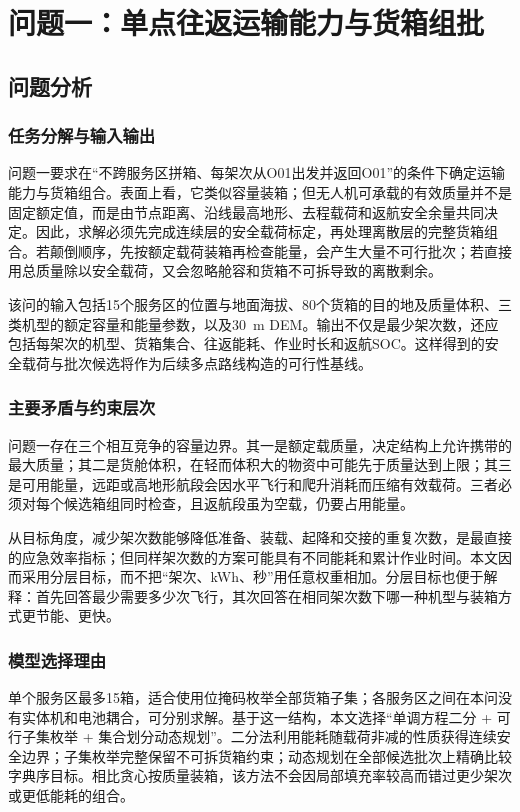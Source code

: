 \section{问题一：单点往返运输能力与货箱组批}
\subsection{问题分析}
\subsubsection{任务分解与输入输出}
问题一要求在“不跨服务区拼箱、每架次从O01出发并返回O01”的条件下确定运输能力与货箱组合。表面上看，它类似容量装箱；但无人机可承载的有效质量并不是固定额定值，而是由节点距离、沿线最高地形、去程载荷和返航安全余量共同决定。因此，求解必须先完成连续层的安全载荷标定，再处理离散层的完整货箱组合。若颠倒顺序，先按额定载荷装箱再检查能量，会产生大量不可行批次；若直接用总质量除以安全载荷，又会忽略舱容和货箱不可拆导致的离散剩余。

该问的输入包括15个服务区的位置与地面海拔、80个货箱的目的地及质量体积、三类机型的额定容量和能量参数，以及30~m DEM。输出不仅是最少架次数，还应包括每架次的机型、货箱集合、往返能耗、作业时长和返航SOC。这样得到的安全载荷与批次候选将作为后续多点路线构造的可行性基线。

\subsubsection{主要矛盾与约束层次}
问题一存在三个相互竞争的容量边界。其一是额定载质量，决定结构上允许携带的最大质量；其二是货舱体积，在轻而体积大的物资中可能先于质量达到上限；其三是可用能量，远距或高地形航段会因水平飞行和爬升消耗而压缩有效载荷。三者必须对每个候选箱组同时检查，且返航段虽为空载，仍要占用能量。

从目标角度，减少架次数能够降低准备、装载、起降和交接的重复次数，是最直接的应急效率指标；但同样架次数的方案可能具有不同能耗和累计作业时间。本文因而采用分层目标，而不把“架次、kWh、秒”用任意权重相加。分层目标也便于解释：首先回答最少需要多少次飞行，其次回答在相同架次数下哪一种机型与装箱方式更节能、更快。

\subsubsection{模型选择理由}
单个服务区最多15箱，适合使用位掩码枚举全部货箱子集；各服务区之间在本问没有实体机和电池耦合，可分别求解。基于这一结构，本文选择“单调方程二分 + 可行子集枚举 + 集合划分动态规划”。二分法利用能耗随载荷非减的性质获得连续安全边界；子集枚举完整保留不可拆货箱约束；动态规划在全部候选批次上精确比较字典序目标。相比贪心按质量装箱，该方法不会因局部填充率较高而错过更少架次或更低能耗的组合。

